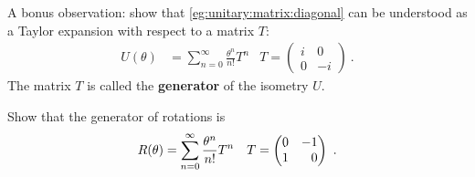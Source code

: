 \documentclass[12pt]{article}
\begin{document}
\begin{exercise}
A bonus observation: show that \eqref{eg:unitary:matrix:diagonal} can be understood as a Taylor expansion with respect to a matrix $T$:
\begin{align}
    U(\theta) &= \sum_{n=0}^\infty \frac{\theta^n}{n!} T^n
    &
    T=
    \begin{pmatrix}
        i & 0\\
        0 & -i
    \end{pmatrix} \ .
\end{align}
The matrix $T$ is called the \textbf{generator} of the isometry $U$. 
\end{exercise}


\begin{exercise}
Show that the generator of rotations is
\begin{align}
    R(\theta) &= \sum_{n=0}^\infty \frac{\theta^n}{n!} T^n
    &
    T=
    \begin{pmatrix}
        0 & -1\\
        1 & \pp 0
    \end{pmatrix} \ .
\end{align}
\end{exercise}


\end{document}
